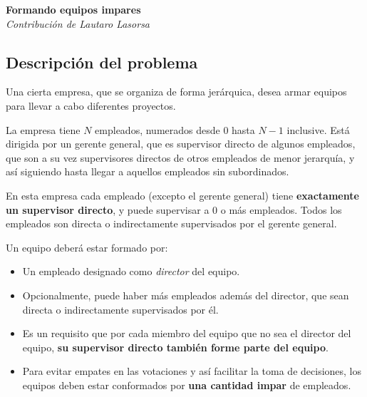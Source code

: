 \documentclass[fontsize=13pt, paper=a4, DIV=calc]{scrartcl}
\renewcommand*{\maketitle}{
	\begin{center}
		\textbf{\nombre}\\
		\textit{\footnotesize Contribución de \author}
	\end{center}
}
\begin{document}
\def\contest{Certamen Jurisdiccional OIA 2022}
\def\nombre{Formando equipos impares}
\def\author{Lautaro Lasorsa}
\def\niveldia{Nivel 3}
\def\numero{4}
\def\archivo{impares}%
\def\version{}


\maketitle
\begin{multicols*}{2}

\section{Descripción del problema}

Una cierta empresa, que se organiza de forma jerárquica, desea armar equipos para llevar a cabo diferentes proyectos.

La empresa tiene $N$ empleados, numerados desde $0$ hasta $N-1$ inclusive. Está dirigida por un gerente general, que es supervisor directo de algunos empleados, que son a su vez supervisores directos de otros empleados de menor jerarquía, y así siguiendo hasta llegar a aquellos empleados sin subordinados.

En esta empresa cada empleado (excepto el gerente general) tiene \textbf{exactamente un supervisor directo}, y puede supervisar a 0 o más empleados. Todos los empleados son directa o indirectamente supervisados por el gerente general.

Un equipo deberá estar formado por:
\begin{itemize}
    \item Un empleado designado como \textit{director} del equipo.
    \item Opcionalmente, puede haber más empleados además del director, que sean directa o indirectamente supervisados por él.
    \item Es un requisito que por cada miembro del equipo que no sea el director del equipo, \textbf{su supervisor directo también forme parte del equipo}.
    \item Para evitar empates en las votaciones y así facilitar la toma de decisiones, los equipos deben estar conformados por \textbf{una cantidad impar} de empleados.
\end{itemize}


\end{multicols*}
\end{document}
